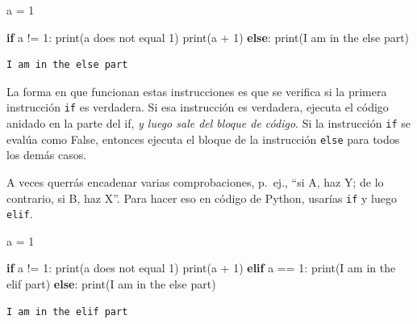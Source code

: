 \documentclass[
  letterpaper,
]{scrbook}
\newenvironment{Shaded}{\begin{snugshade}}{\end{snugshade}}
\newcommand{\BuiltInTok}[1]{\textcolor[rgb]{0.00,0.23,0.31}{#1}}
\newcommand{\ControlFlowTok}[1]{\textcolor[rgb]{0.00,0.23,0.31}{\textbf{#1}}}
\newcommand{\DecValTok}[1]{\textcolor[rgb]{0.68,0.00,0.00}{#1}}
\newcommand{\NormalTok}[1]{\textcolor[rgb]{0.00,0.23,0.31}{#1}}
\newcommand{\OperatorTok}[1]{\textcolor[rgb]{0.37,0.37,0.37}{#1}}
\newcommand{\StringTok}[1]{\textcolor[rgb]{0.13,0.47,0.30}{#1}}
\begin{document}
\begin{Shaded}
\begin{Highlighting}[]
\NormalTok{a }\OperatorTok{=} \DecValTok{1}

\ControlFlowTok{if}\NormalTok{ a }\OperatorTok{!=} \DecValTok{1}\NormalTok{:}
  \BuiltInTok{print}\NormalTok{(}\StringTok{\textquotesingle{}a does not equal 1\textquotesingle{}}\NormalTok{)}
  \BuiltInTok{print}\NormalTok{(a }\OperatorTok{+} \DecValTok{1}\NormalTok{)}
\ControlFlowTok{else}\NormalTok{:}
  \BuiltInTok{print}\NormalTok{(}\StringTok{\textquotesingle{}I am in the else part\textquotesingle{}}\NormalTok{)}
\end{Highlighting}
\end{Shaded}

\begin{verbatim}
I am in the else part
\end{verbatim}

La forma en que funcionan estas instrucciones es que se verifica si la
primera instrucción \texttt{if} es verdadera. Si esa instrucción es
verdadera, ejecuta el código anidado en la parte del if, \emph{y luego
sale del bloque de código}. Si la instrucción \texttt{if} se evalúa como
False, entonces ejecuta el bloque de la instrucción \texttt{else} para
todos los demás casos.

A veces querrás encadenar varias comprobaciones, p.~ej., ``si A, haz Y;
de lo contrario, si B, haz X''. Para hacer eso en código de Python,
usarías \texttt{if} y luego \texttt{elif}.

\begin{Shaded}
\begin{Highlighting}[]
\NormalTok{a }\OperatorTok{=} \DecValTok{1}

\ControlFlowTok{if}\NormalTok{ a }\OperatorTok{!=} \DecValTok{1}\NormalTok{:}
  \BuiltInTok{print}\NormalTok{(}\StringTok{\textquotesingle{}a does not equal 1\textquotesingle{}}\NormalTok{)}
  \BuiltInTok{print}\NormalTok{(a }\OperatorTok{+} \DecValTok{1}\NormalTok{)}
\ControlFlowTok{elif}\NormalTok{ a }\OperatorTok{==} \DecValTok{1}\NormalTok{:}
  \BuiltInTok{print}\NormalTok{(}\StringTok{\textquotesingle{}I am in the elif part\textquotesingle{}}\NormalTok{)}
\ControlFlowTok{else}\NormalTok{:}
  \BuiltInTok{print}\NormalTok{(}\StringTok{\textquotesingle{}I am in the else part\textquotesingle{}}\NormalTok{)}
\end{Highlighting}
\end{Shaded}

\begin{verbatim}
I am in the elif part
\end{verbatim}
\end{document}

